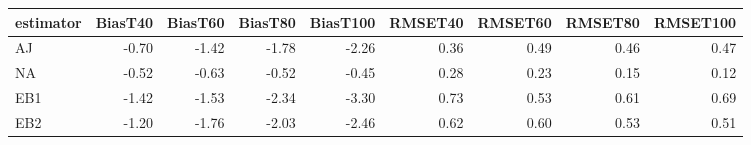 \begin{table}[ht]
\centering
\begin{tabular}{lrrrrrrrr}
  \toprule
estimator & BiasT40 & BiasT60 & BiasT80 & BiasT100 & RMSET40 & RMSET60 & RMSET80 & RMSET100 \\ 
  \midrule
AJ & -0.70 & -1.42 & -1.78 & -2.26 & 0.36 & 0.49 & 0.46 & 0.47 \\ 
  NA & -0.52 & -0.63 & -0.52 & -0.45 & 0.28 & 0.23 & 0.15 & 0.12 \\ 
  EB1 & -1.42 & -1.53 & -2.34 & -3.30 & 0.73 & 0.53 & 0.61 & 0.69 \\ 
  EB2 & -1.20 & -1.76 & -2.03 & -2.46 & 0.62 & 0.60 & 0.53 & 0.51 \\ 
   \bottomrule
\end{tabular}
\end{table}
